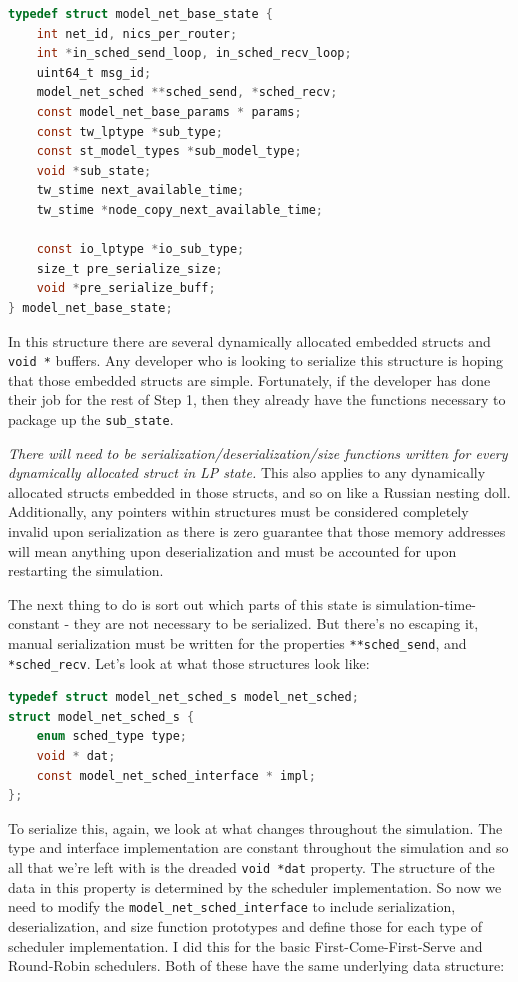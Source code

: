 \documentclass[letterpaper, 11 pt, conference]{IEEEtran}
\begin{document}
\begin{lstlisting}[language=C]
typedef struct model_net_base_state {
	int net_id, nics_per_router;
	int *in_sched_send_loop, in_sched_recv_loop;
	uint64_t msg_id;
	model_net_sched **sched_send, *sched_recv;
	const model_net_base_params * params;
	const tw_lptype *sub_type;
	const st_model_types *sub_model_type;
	void *sub_state;
	tw_stime next_available_time;
	tw_stime *node_copy_next_available_time;
	
	const io_lptype *io_sub_type;
	size_t pre_serialize_size;
	void *pre_serialize_buff;
} model_net_base_state;
\end{lstlisting}

In this structure there are several dynamically allocated embedded structs and \texttt{void *} buffers. Any developer who is looking to serialize this structure is hoping that those embedded structs are simple. Fortunately, if the developer has done their job for the rest of Step 1, then they already have the functions necessary to package up the \texttt{sub\_state}. 

\emph{There will need to be serialization/deserialization/size functions written for every dynamically allocated struct in LP state.} This also applies to any dynamically allocated structs embedded in those structs, and so on like a Russian nesting doll. Additionally, any pointers within structures must be considered completely invalid upon serialization as there is zero guarantee that those memory addresses will mean anything upon deserialization and must be accounted for upon restarting the simulation.

The next thing to do is sort out which parts of this state is simulation-time-constant - they are not necessary to be serialized. But there's no escaping it, manual serialization must be written for the properties \texttt{**sched\_send}, and \texttt{*sched\_recv}. Let's look at what those structures look like:

\begin{lstlisting}[language=C]
typedef struct model_net_sched_s model_net_sched;
struct model_net_sched_s {
	enum sched_type type;
	void * dat;
	const model_net_sched_interface * impl;
};
\end{lstlisting}

To serialize this, again, we look at what changes throughout the simulation. The type and interface implementation are constant throughout the simulation and so all that we're left with is the dreaded \texttt{void *dat} property. The structure of the data in this property is determined by the scheduler implementation. So now we need to modify the \texttt{model\_net\_sched\_interface} to include serialization, deserialization, and size function prototypes and define those for each type of scheduler implementation. I did this for the basic First-Come-First-Serve and Round-Robin schedulers. Both of these have the same underlying data structure:
\end{document}
